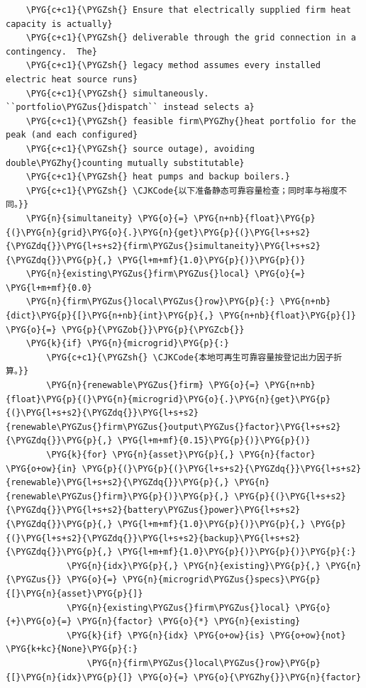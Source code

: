 \begin{Verbatim}
    \PYG{c+c1}{\PYGZsh{} Ensure that electrically supplied firm heat capacity is actually}
    \PYG{c+c1}{\PYGZsh{} deliverable through the grid connection in a contingency.  The}
    \PYG{c+c1}{\PYGZsh{} legacy method assumes every installed electric heat source runs}
    \PYG{c+c1}{\PYGZsh{} simultaneously.  ``portfolio\PYGZus{}dispatch`` instead selects a}
    \PYG{c+c1}{\PYGZsh{} feasible firm\PYGZhy{}heat portfolio for the peak (and each configured}
    \PYG{c+c1}{\PYGZsh{} source outage), avoiding double\PYGZhy{}counting mutually substitutable}
    \PYG{c+c1}{\PYGZsh{} heat pumps and backup boilers.}
    \PYG{c+c1}{\PYGZsh{} \CJKCode{以下准备静态可靠容量检查；同时率与裕度不同。}}
    \PYG{n}{simultaneity} \PYG{o}{=} \PYG{n+nb}{float}\PYG{p}{(}\PYG{n}{grid}\PYG{o}{.}\PYG{n}{get}\PYG{p}{(}\PYG{l+s+s2}{\PYGZdq{}}\PYG{l+s+s2}{firm\PYGZus{}simultaneity}\PYG{l+s+s2}{\PYGZdq{}}\PYG{p}{,} \PYG{l+m+mf}{1.0}\PYG{p}{)}\PYG{p}{)}
    \PYG{n}{existing\PYGZus{}firm\PYGZus{}local} \PYG{o}{=} \PYG{l+m+mf}{0.0}
    \PYG{n}{firm\PYGZus{}local\PYGZus{}row}\PYG{p}{:} \PYG{n+nb}{dict}\PYG{p}{[}\PYG{n+nb}{int}\PYG{p}{,} \PYG{n+nb}{float}\PYG{p}{]} \PYG{o}{=} \PYG{p}{\PYGZob{}}\PYG{p}{\PYGZcb{}}
    \PYG{k}{if} \PYG{n}{microgrid}\PYG{p}{:}
        \PYG{c+c1}{\PYGZsh{} \CJKCode{本地可再生可靠容量按登记出力因子折算。}}
        \PYG{n}{renewable\PYGZus{}firm} \PYG{o}{=} \PYG{n+nb}{float}\PYG{p}{(}\PYG{n}{microgrid}\PYG{o}{.}\PYG{n}{get}\PYG{p}{(}\PYG{l+s+s2}{\PYGZdq{}}\PYG{l+s+s2}{renewable\PYGZus{}firm\PYGZus{}output\PYGZus{}factor}\PYG{l+s+s2}{\PYGZdq{}}\PYG{p}{,} \PYG{l+m+mf}{0.15}\PYG{p}{)}\PYG{p}{)}
        \PYG{k}{for} \PYG{n}{asset}\PYG{p}{,} \PYG{n}{factor} \PYG{o+ow}{in} \PYG{p}{(}\PYG{p}{(}\PYG{l+s+s2}{\PYGZdq{}}\PYG{l+s+s2}{renewable}\PYG{l+s+s2}{\PYGZdq{}}\PYG{p}{,} \PYG{n}{renewable\PYGZus{}firm}\PYG{p}{)}\PYG{p}{,} \PYG{p}{(}\PYG{l+s+s2}{\PYGZdq{}}\PYG{l+s+s2}{battery\PYGZus{}power}\PYG{l+s+s2}{\PYGZdq{}}\PYG{p}{,} \PYG{l+m+mf}{1.0}\PYG{p}{)}\PYG{p}{,} \PYG{p}{(}\PYG{l+s+s2}{\PYGZdq{}}\PYG{l+s+s2}{backup}\PYG{l+s+s2}{\PYGZdq{}}\PYG{p}{,} \PYG{l+m+mf}{1.0}\PYG{p}{)}\PYG{p}{)}\PYG{p}{:}
            \PYG{n}{idx}\PYG{p}{,} \PYG{n}{existing}\PYG{p}{,} \PYG{n}{\PYGZus{}} \PYG{o}{=} \PYG{n}{microgrid\PYGZus{}specs}\PYG{p}{[}\PYG{n}{asset}\PYG{p}{]}
            \PYG{n}{existing\PYGZus{}firm\PYGZus{}local} \PYG{o}{+}\PYG{o}{=} \PYG{n}{factor} \PYG{o}{*} \PYG{n}{existing}
            \PYG{k}{if} \PYG{n}{idx} \PYG{o+ow}{is} \PYG{o+ow}{not} \PYG{k+kc}{None}\PYG{p}{:}
                \PYG{n}{firm\PYGZus{}local\PYGZus{}row}\PYG{p}{[}\PYG{n}{idx}\PYG{p}{]} \PYG{o}{=} \PYG{o}{\PYGZhy{}}\PYG{n}{factor}


\end{Verbatim}
